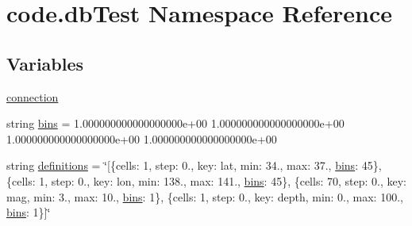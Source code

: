 \hypertarget{namespacecode_1_1db_test}{}\section{code.\+db\+Test Namespace Reference}
\label{namespacecode_1_1db_test}
\subsection*{Variables}
\begin{DoxyCompactItemize}
\item 
\hyperlink{namespacecode_1_1db_test_adb7cfea0c26c75be85f5b69f5f614495}{connection}
\item 
string \hyperlink{namespacecode_1_1db_test_a561bd0a04a7558dbcf60255372f36535}{bins} = \textquotesingle{}1.\+000000000000000000e+00 1.\+000000000000000000e+00 1.\+000000000000000000e+00 1.\+000000000000000000e+00\textquotesingle{}
\item 
string \hyperlink{namespacecode_1_1db_test_a18a56fcf49697eac62112214eac2cfc9}{definitions} = \char`\"{}\mbox{[}\{\textquotesingle{}cells\textquotesingle{}\+: 1, \textquotesingle{}step\textquotesingle{}\+: 0., \textquotesingle{}key\textquotesingle{}\+: \textquotesingle{}lat\textquotesingle{}, \textquotesingle{}min\textquotesingle{}\+: 34., \textquotesingle{}max\textquotesingle{}\+: 37., \textquotesingle{}\hyperlink{namespacecode_1_1db_test_a561bd0a04a7558dbcf60255372f36535}{bins}\textquotesingle{}\+: 45\}, \{\textquotesingle{}cells\textquotesingle{}\+: 1, \textquotesingle{}step\textquotesingle{}\+: 0., \textquotesingle{}key\textquotesingle{}\+: \textquotesingle{}lon\textquotesingle{}, \textquotesingle{}min\textquotesingle{}\+: 138., \textquotesingle{}max\textquotesingle{}\+: 141., \textquotesingle{}\hyperlink{namespacecode_1_1db_test_a561bd0a04a7558dbcf60255372f36535}{bins}\textquotesingle{}\+: 45\}, \{\textquotesingle{}cells\textquotesingle{}\+: 70, \textquotesingle{}step\textquotesingle{}\+: 0., \textquotesingle{}key\textquotesingle{}\+: \textquotesingle{}mag\textquotesingle{}, \textquotesingle{}min\textquotesingle{}\+: 3., \textquotesingle{}max\textquotesingle{}\+: 10., \textquotesingle{}\hyperlink{namespacecode_1_1db_test_a561bd0a04a7558dbcf60255372f36535}{bins}\textquotesingle{}\+: 1\}, \{\textquotesingle{}cells\textquotesingle{}\+: 1, \textquotesingle{}step\textquotesingle{}\+: 0., \textquotesingle{}key\textquotesingle{}\+: \textquotesingle{}depth\textquotesingle{}, \textquotesingle{}min\textquotesingle{}\+: 0., \textquotesingle{}max\textquotesingle{}\+: 100., \textquotesingle{}\hyperlink{namespacecode_1_1db_test_a561bd0a04a7558dbcf60255372f36535}{bins}\textquotesingle{}\+: 1\}\mbox{]}\char`\"{}

\end{DoxyCompactItemize}
